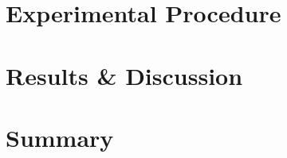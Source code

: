 \documentclass[12pt,oneside]{book}
\begin{document}
\chapter{Experimental Procedure}
\label{chap:exp_procedure}



\chapter{Results \& Discussion}


\chapter{Summary}




\clearpage

\appendix
\captionsetup{list=no}
\end{document}
